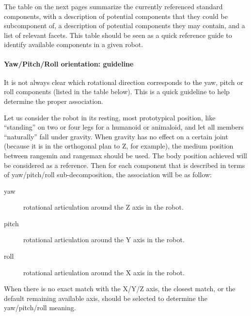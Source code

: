 The table on the next pages summarize the currently referenced standard
components, with a description of potential components that they could
be subcomponent of, a description of potential components they may
contain, and a list of relevant facets. This table should be seen as a
quick reference guide to identify available components in a given
robot.

\paragraph{Yaw/Pitch/Roll orientation: guideline}


It is not always clear which rotational direction corresponds to the
yaw, pitch or roll components (listed in the table below). This is a
quick guideline to help determine the proper association.


Let us consider the robot in its resting, most prototypical position,
like “standing” on two or four legs for a humanoid or animaloid, and
let all members “naturally” fall under gravity. When gravity has no
effect on a certain joint (because it is in the orthogonal plan to Z,
for example), the medium position between rangemin and rangemax should
be used. The body position achieved will be considered as a reference.
Then for each component that is described in terms of yaw/pitch/roll
sub-decomposition, the association will be as follow:

\begin{description}
\item[yaw] rotational articulation around the Z axis in the robot.
\item[pitch] rotational articulation around the Y axis in the robot.
\item[roll] rotational articulation around the X axis in the robot.
\end{description}

When there is no exact match with the X/Y/Z axis, the closest match, or
the default remaining available axis, should be selected to determine
the yaw/pitch/roll meaning.

